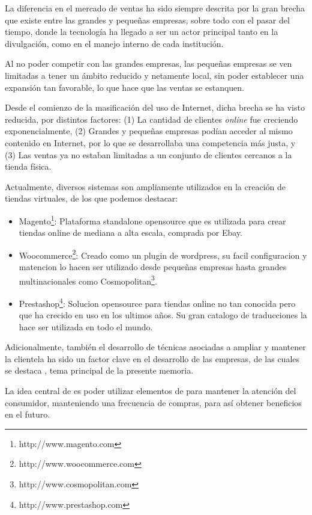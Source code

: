 La diferencia en el mercado de ventas ha sido siempre descrita por la gran
brecha que existe entre las grandes y pequeñas empresas, sobre todo con el
pasar del tiempo, donde la tecnología ha llegado a ser un actor principal
tanto en la divulgación, como en el manejo interno de cada institución.

Al no poder competir con las grandes empresas, las pequeñas empresas se ven
limitadas a tener un ámbito reducido y netamente local, sin poder establecer
una expansión tan favorable, lo que hace que las ventas se estanquen.

Desde el comienzo de la masificación del uso de Internet, dicha brecha se ha
visto reducida, por distintos factores: (1) La cantidad de clientes \emph{online}
fue creciendo exponencialmente, (2) Grandes y pequeñas empresas podían acceder
al mismo contenido en Internet, por lo que se desarrollaba una competencia
más justa, y (3) Las ventas ya no estaban limitadas a un conjunto de clientes
cercanos a la tienda física.

Actualmente, diversos sistemas son ampliamente utilizados en la creación
de tiendas virtuales, de los que podemos destacar:
\begin{itemize}

\item Magento\footnote{http://www.magento.com}: Plataforma standalone opensource que es utilizada para crear tiendas 
online de mediana a alta escala, comprada por Ebay.
\item Woocommerce\footnote{http://www.woocommerce.com}: Creado como un plugin de wordpress, su facil
configuracion y matencion lo hacen ser utilizado desde pequeñas empresas hasta grandes multinacionales 
como Cosmopolitan\footnote{http://www.cosmopolitan.com}.
\item Prestashop\footnote{http://www.prestashop.com}: Solucion opensource para tiendas online no tan conocida pero
que ha crecido en uso en los ultimos años. Su gran catalogo de traducciones la hace ser utilizada en todo el mundo.

\end{itemize}  

Adicionalmente, también el desarrollo de técnicas asociadas a ampliar y mantener
la clientela ha sido un factor clave en el desarrollo de las empresas,
de las cuales se destaca {\GAM}, tema principal de la presente memoria.

La idea central de  {\GAM} es poder utilizar elementos de 
para mantener la atención del consumidor, manteniendo una frecuencia de compras,
para así obtener beneficios en el futuro.

